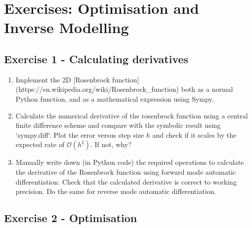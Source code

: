 \documentclass[a4paper]{article}
\begin{document}
\section*{Exercises: Optimisation and Inverse Modelling}

\vspace{0,75cm}


\subsection*{Exercise 1 - Calculating derivatives}

\begin{enumerate}[label=\Alph*]
\item Implement the 2D [Rosenbrock
function](https://en.wikipedia.org/wiki/Rosenbrock_function) both as a normal Python
function, and as a mathematical expression using Sympy.

\item Calculate the numerical derivative of the rosenbrock function using a central
  finite difference scheme and compare with the symbolic result using `sympy.diff`. Plot
    the error versus step size $h$ and check if it scales by the expected rate of
    $\mathcal{O}(h^2)$. If not, why?

\item Manually write down (in Python code) the required operations to calculate the
    derivative of the Rosenbrock function using forward mode automatic differentiation.
    Check that the calculated derivative is correct to working precision. Do the same
    for reverse mode automatic differentiation. 
\end{enumerate}

\subsection*{Exercise 2 - Optimisation}
\end{document}
